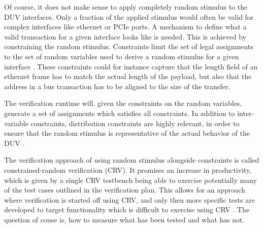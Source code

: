 \documentclass[12pt]{report}
\begin{document}
Of course, it does not make sense to apply completely random stimulus to the DUV interfaces. Only a fraction of the
applied stimulus would often be valid for complex interfaces like ethernet or PCIe ports. A mechanism to define what
a valid transaction for a given interface looks like is needed. This is achieved by constraining the random stimulus.
Constraints limit the set of legal assignments to the set of random variables used to derive a random stimulus for a
given interface \cite[Ch. 3]{bergeron2012writing}. These constraints could for instance capture that the length field
of an ethernet frame has to match the actual length of the payload, but also that the address in a bus transaction
has to be aligned to the size of the transfer.

The verification runtime will, given the constraints on the random variables, generate a set of assignments which
satisfies all constraints. In addition to inter-variable constraints, distribution constraints are highly relevant,
in order to ensure that the random stimulus is representative of the actual behavior of the DUV \cite[Sec. 7.5]{flake2020a}.

The verification approach of using random stimulus alongside constraints is called constrained-random verification
(CRV). It promises an increase in productivity, which is given by a single CRV testbench being able to exercise
potentially many of the test cases outlined in the verification plan. This allows for an approach where verification
is started off using CRV, and only then more specific tests are developed to target functionality which is difficult
to exercise using CRV \cite[Ch. 3]{bergeron2012writing}. The question of couse is, how to measure what has been
tested and what has not.

\begin{comment}

start of with CRV and then add specific tests with constrains for uncovered features \cite[Ch. 3]{bergeron2012writing}

by exercising many of
these features with a single, very long stream of random stimulus . If the stimulus
generator is properly constrained to produce valid transaction patterns, it may not only produce the test cases
captured in the verification plan, but may even lead to conditions not considered in the verification plan, like some
hard-to-trigger edge cases \cite[Ch. 3]{bergeron2012writing}.

\cite[Ch. 13]{mehta2021introduction}

- idea is quite simple
- but achieving actually exhaustive random stimulus can be difficult

\end{comment}
\end{document}

